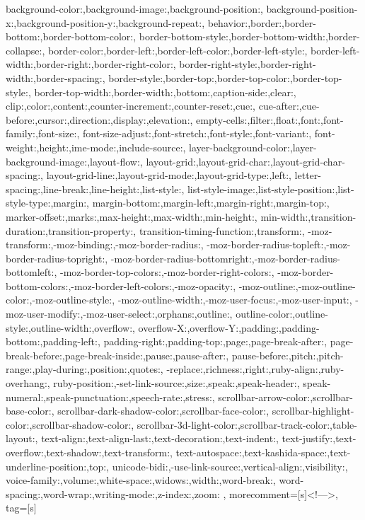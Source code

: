 {{        background-color:,background-image:,background-position:,
        background-position-x:,background-position-y:,background-repeat:,
        behavior:,border:,border-bottom:,border-bottom-color:,
        border-bottom-style:,border-bottom-width:,border-collapse:,
        border-color:,border-left:,border-left-color:,border-left-style:,
        border-left-width:,border-right:,border-right-color:,
        border-right-style:,border-right-width:,border-spacing:,
        border-style:,border-top:,border-top-color:,border-top-style:,
        border-top-width:,border-width:,bottom:,caption-side:,clear:,
        clip:,color:,content:,counter-increment:,counter-reset:,cue:,
        cue-after:,cue-before:,cursor:,direction:,display:,elevation:,
        empty-cells:,filter:,float:,font:,font-family:,font-size:,
        font-size-adjust:,font-stretch:,font-style:,font-variant:,
        font-weight:,height:,ime-mode:,include-source:,
        layer-background-color:,layer-background-image:,layout-flow:,
        layout-grid:,layout-grid-char:,layout-grid-char-spacing:,
        layout-grid-line:,layout-grid-mode:,layout-grid-type:,left:,
        letter-spacing:,line-break:,line-height:,list-style:,
        list-style-image:,list-style-position:,list-style-type:,margin:,
        margin-bottom:,margin-left:,margin-right:,margin-top:,
        marker-offset:,marks:,max-height:,max-width:,min-height:,
        min-width:,transition-duration:,transition-property:,
        transition-timing-function:,transform:,
        -moz-transform:,-moz-binding:,-moz-border-radius:,
        -moz-border-radius-topleft:,-moz-border-radius-topright:,
        -moz-border-radius-bottomright:,-moz-border-radius-bottomleft:,
        -moz-border-top-colors:,-moz-border-right-colors:,
        -moz-border-bottom-colors:,-moz-border-left-colors:,-moz-opacity:,
        -moz-outline:,-moz-outline-color:,-moz-outline-style:,
        -moz-outline-width:,-moz-user-focus:,-moz-user-input:,
        -moz-user-modify:,-moz-user-select:,orphans:,outline:,
        outline-color:,outline-style:,outline-width:,overflow:,
        overflow-X:,overflow-Y:,padding:,padding-bottom:,padding-left:,
        padding-right:,padding-top:,page:,page-break-after:,
        page-break-before:,page-break-inside:,pause:,pause-after:,
        pause-before:,pitch:,pitch-range:,play-during:,position:,quotes:,
        -replace:,richness:,right:,ruby-align:,ruby-overhang:,
        ruby-position:,-set-link-source:,size:,speak:,speak-header:,
        speak-numeral:,speak-punctuation:,speech-rate:,stress:,
        scrollbar-arrow-color:,scrollbar-base-color:,
        scrollbar-dark-shadow-color:,scrollbar-face-color:,
        scrollbar-highlight-color:,scrollbar-shadow-color:,
        scrollbar-3d-light-color:,scrollbar-track-color:,table-layout:,
        text-align:,text-align-last:,text-decoration:,text-indent:,
        text-justify:,text-overflow:,text-shadow:,text-transform:,
        text-autospace:,text-kashida-space:,text-underline-position:,top:,
        unicode-bidi:,-use-link-source:,vertical-align:,visibility:,
        voice-family:,volume:,white-space:,widows:,width:,word-break:,
        word-spacing:,word-wrap:,writing-mode:,z-index:,zoom:
        },
        morecomment=[s]{<!--}{-->},
        tag=[s]
}